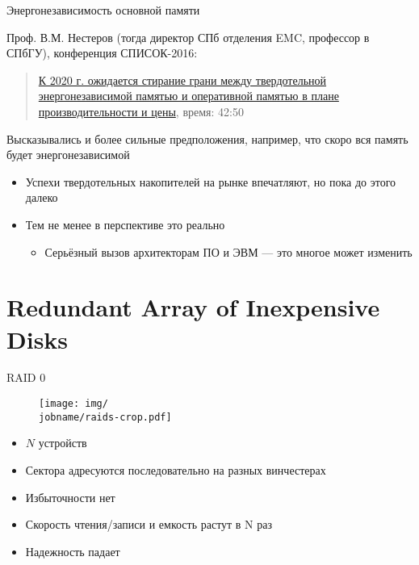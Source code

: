 \documentclass[xetex,aspectratio=43]{beamer}
\begin{document}
\begin{frame}[fragile]{Энергонезависимость основной памяти}

    Проф. В.М. Нестеров (тогда директор СПб отделения EMC, профессор в
    СПбГУ), конференция СПИСОК-2016:

    \begin{quote}
        \href{http://spisok.math.spbu.ru/video/2016/4.mp4}{К 2020 г. ожидается стирание грани между твердотельной энергонезависимой памятью и оперативной памятью в плане производительности и цены}, время: 42:50
    \end{quote}

    \pause

    Высказывались и более сильные предположения, например, что скоро вся память будет энергонезависимой

    \begin{itemize}
        \tightlist
        \item
        Успехи твердотельных накопителей на рынке впечатляют, но пока до этого далеко
        \item
        Тем не менее в перспективе это реально

        \begin{itemize}
            \tightlist
            \item
            Серьёзный вызов архитекторам ПО и ЭВМ --- это многое может изменить
        \end{itemize}
    \end{itemize}

\end{frame}

\section{Redundant Array of Inexpensive Disks}


\begin{frame}{RAID 0}
    \begin{figure}
        \texttt{[image: img/\\jobname/raids-crop.pdf]}
    \end{figure}

\begin{itemize}
\tightlist
\item
  \(N\) устройств
\item
  Сектора адресуются последовательно на разных винчестерах
\item
  Избыточности нет
\item
  Скорость чтения/записи и емкость растут в N раз
\item
  Надежность падает
\end{itemize}
\end{frame}
\end{document}
